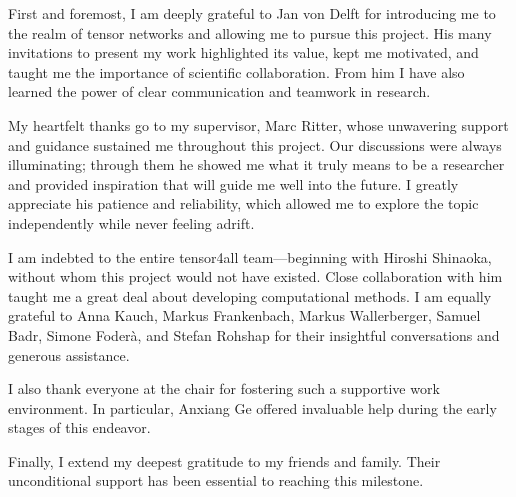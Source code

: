 First and foremost, I am deeply grateful to Jan von Delft for introducing me to the realm of tensor networks and allowing me to pursue this project. His many invitations to present my work highlighted its value, kept me motivated, and taught me the importance of scientific collaboration. From him I have also learned the power of clear communication and teamwork in research.

My heartfelt thanks go to my supervisor, Marc Ritter, whose unwavering support and guidance sustained me throughout this project. Our discussions were always illuminating; through them he showed me what it truly means to be a researcher and provided inspiration that will guide me well into the future. I greatly appreciate his patience and reliability, which allowed me to explore the topic independently while never feeling adrift.

I am indebted to the entire tensor4all team—beginning with Hiroshi Shinaoka, without whom this project would not have existed. Close collaboration with him taught me a great deal about developing computational methods. I am equally grateful to Anna Kauch, Markus Frankenbach, Markus Wallerberger, Samuel Badr, Simone Foderà, and Stefan Rohshap for their insightful conversations and generous assistance.

I also thank everyone at the chair for fostering such a supportive work environment. In particular, Anxiang Ge offered invaluable help during the early stages of this endeavor.

Finally, I extend my deepest gratitude to my friends and family. Their unconditional support has been essential to reaching this milestone.


